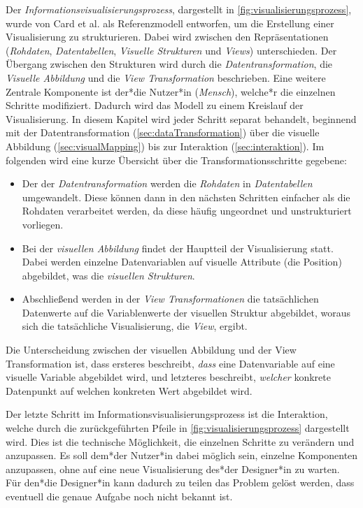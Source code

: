 Der \emph{Informationsvisualisierungsprozess}, dargestellt in \autoref{fig:visualisierungsprozess}, wurde von Card et al. als Referenzmodell entworfen, um die Erstellung einer Visualisierung zu strukturieren. Dabei wird zwischen den Repräsentationen (\emph{Rohdaten}, \emph{Datentabellen}, \emph{Visuelle Strukturen} und \emph{Views}) unterschieden. Der Übergang zwischen den Strukturen wird durch die \emph{Datentransformation}, die \emph{Visuelle Abbildung} und die \emph{View Transformation} beschrieben. Eine weitere Zentrale Komponente ist der*die Nutzer*in (\emph{Mensch}), welche*r die einzelnen Schritte modifiziert. Dadurch wird das Modell zu einem Kreislauf der Visualisierung. In diesem Kapitel wird jeder Schritt separat behandelt, beginnend mit der Datentransformation (\autoref{sec:dataTransformation}) über die visuelle Abbildung (\autoref{sec:visualMapping}) bis zur Interaktion (\autoref{sec:interaktion}). Im folgenden wird eine kurze Übersicht über die Transformationsschritte gegebene:
\begin{itemize}
	\item {} Der der \emph{Datentransformation} werden die \emph{Rohdaten} in \emph{Datentabellen} umgewandelt. Diese können dann in den nächsten Schritten einfacher als die Rohdaten verarbeitet werden, da diese häufig ungeordnet und unstrukturiert vorliegen.
	\item {}  Bei der \emph{visuellen Abbildung} findet der Hauptteil der Visualisierung statt. Dabei werden einzelne Datenvariablen auf visuelle Attribute (\bspw die Position) abgebildet, was die \emph{visuellen Strukturen}.
	\item {} Abschließend werden in der \emph{View Transformationen} die tatsächlichen Datenwerte auf die Variablenwerte der visuellen Struktur abgebildet, woraus sich die tatsächliche Visualisierung, die \emph{View}, ergibt.
\end{itemize}
Die Unterscheidung zwischen der visuellen Abbildung und der View Transformation ist, dass ersteres beschreibt, \emph{dass} eine Datenvariable auf eine visuelle Variable abgebildet wird, und letzteres beschreibt, \emph{welcher} konkrete Datenpunkt auf welchen konkreten Wert abgebildet wird.

Der letzte Schritt im Informationsvisualisierungsprozess ist die Interaktion, welche durch die zurückgeführten Pfeile in \autoref{fig:visualisierungsprozess} dargestellt wird. Dies ist die technische Möglichkeit, die einzelnen Schritte zu verändern und anzupassen. Es soll dem*der Nutzer*in dabei möglich sein, einzelne Komponenten anzupassen, ohne auf eine neue Visualisierung des*der Designer*in zu warten. Für den*die Designer*in kann dadurch zu teilen das Problem gelöst werden, dass eventuell die genaue Aufgabe noch nicht bekannt ist.

